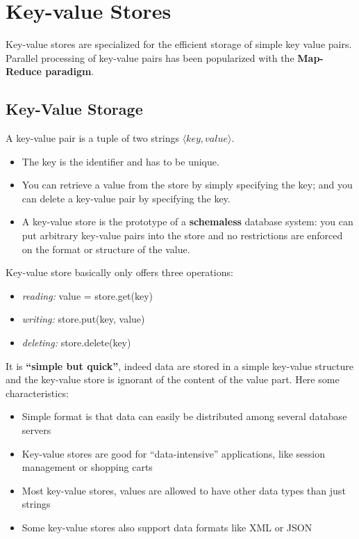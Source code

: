 \chapter{Key-value Stores}
Key-value stores are specialized for the efficient storage of simple key value pairs. Parallel processing of key-value pairs has been popularized with the \textbf{Map-Reduce paradigm}.

\section{Key-Value Storage}
A key-value pair is a tuple of two strings $\langle key, value \rangle$. 
\begin{itemize}
    \item The key is the identifier and has to be unique.
    \item You can retrieve a value from the store by simply specifying the key; and you can delete a key-value pair by specifying the key.
    \item  A key-value store is the prototype of a \textbf{schemaless} database system: you can put arbitrary key-value pairs into the store and no restrictions are enforced on the format or structure of the value.
\end{itemize} 

Key-value store basically only offers three operations:
\begin{itemize}
    \item \textit{reading:} value = store.get(key)
    \item \textit{writing:} store.put(key, value)
    \item \textit{deleting:} store.delete(key)
\end{itemize}
It is \textbf{“simple but quick”}, indeed data are stored in a simple key-value structure and the key-value store is ignorant of the content of the value part. Here some characteristics:
\begin{itemize}
    \item Simple format is that data can easily be distributed among several database servers
    \item Key-value stores are good for “data-intensive” applications, like session management or shopping carts
    \item Most key-value stores, values are allowed to have other data types than just strings
    \item Some key-value stores also support data formats like XML or JSON
\end{itemize}

